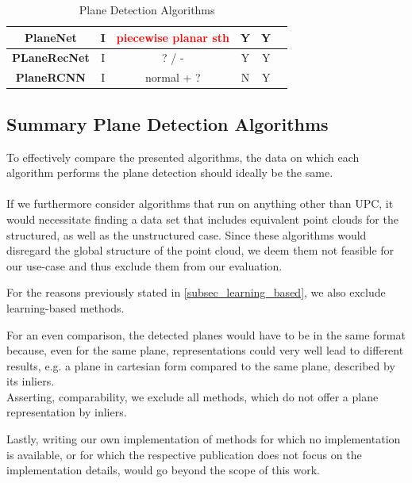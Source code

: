 \documentclass[main.tex]{subfiles}
\begin{document}
\begin{table}[!h]
\begin{tabular}{|c|c|c|c|c|c}
        \textbf{PlaneNet} \cite{Liu_Yang_Ceylan_Yumer_Furukawa_2018}     & I                   & \textcolor{red}{piecewise planar sth} & Y                       & Y                     \\ \hline
        \textbf{PLaneRecNet} \cite{Xie_Shu_Rambach_Pagani_Stricker_2022} & I                   & ? / -                                 & Y                       & Y                     \\ \hline
        \textbf{PlaneRCNN} \cite{Liu_Kim_Gu_Furukawa_Kautz_2019}         & I                   & normal + ?                            & N                       & Y                     \\ \hline
    \end{tabular}
    \caption{Plane Detection Algorithms}
    \label{tab:my-table}
\end{table}

\subsection*{Summary Plane Detection Algorithms}
To effectively compare the presented algorithms, the data on which each algorithm performs the plane detection should ideally be the same. \\ \\
If we furthermore consider algorithms that run on anything other than UPC, it would necessitate finding a data set that includes equivalent point clouds for the structured, as well as
the unstructured case.
Since these algorithms would disregard the global structure of the point cloud, we deem them not feasible for our use-case and thus exclude them from
our evaluation.

For the reasons previously stated in \ref{subsec_learning_based}, we also exclude learning-based methods.

For an even comparison, the detected planes would have to be in the same format because, even for the same plane, representations could very well
lead to different results, e.g. a plane in cartesian form compared to the same plane, described by its inliers.\\
Asserting, comparability, we exclude all methods, which do not offer a plane representation by inliers.

Lastly, writing our own implementation of methods for which no implementation is available, or for which the respective publication does not
focus on the implementation details, would go beyond the scope of this work.
\end{document}
